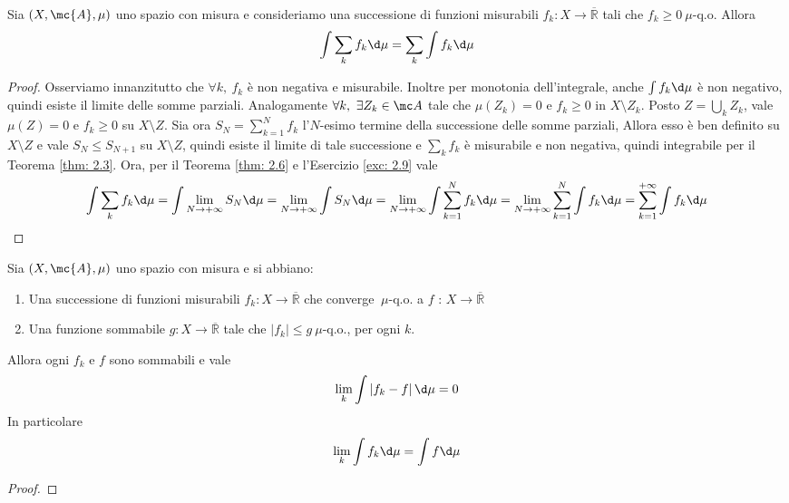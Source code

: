 \begin{corollary}\label{cor: 2.2 serie}
Sia $(X, \mc{A}, \mu)$ uno spazio con misura e consideriamo una successione di funzioni misurabili $f_{k}: X \rightarrow \overline{\mathbb{R}}$ tali che $f_{k} \geq 0 \ \mu$-q.o. Allora
\[\int \sum_{k} f_{k} \d \mu=\sum_{k} \int f_{k} \d \mu\]
\end{corollary}
\begin{proof}
    Osserviamo innanzitutto che $\forall k,\ f_k$ è non negativa e misurabile. Inoltre per monotonia dell'integrale, anche $\int f_k\d\mu$ è non negativo, quindi esiste il limite delle somme parziali. Analogamente $\forall k,\ \exists Z_k\in \mc A$ tale che $\mu(Z_k)=0$ e $f_k\geq 0$ in $X\setminus Z_k$. Posto $Z=\bigcup_kZ_k$, vale $\mu(Z)=0$ e $f_k\geq 0$ su $X\setminus Z$. Sia ora $S_N = \sum_{k=1}^Nf_k$ l'$N$-esimo termine della successione delle somme parziali, Allora esso è ben definito su $X\setminus Z$ e vale $S_N\leq S_{N+1}$ su $X\setminus Z$, quindi esiste il limite di tale successione e $\sum_kf_k$ è misurabile e non negativa, quindi integrabile per il Teorema \ref{thm: 2.3}. Ora, per il Teorema \ref{thm: 2.6} e l'Esercizio \ref{exc: 2.9} vale
    \[\int \sum_{k} f_{k} \d \mu=\int \lim_{N\to +\infty}S_N \d \mu=\lim_{N\to +\infty}\int S_N \d \mu=\lim_{N\to +\infty}\int \sum_{k=1}^Nf_k \d \mu=\lim_{N\to +\infty}\sum_{k=1}^N\int f_k \d \mu=\sum_{k=1}^{+\infty}\int f_k \d \mu\qedhere\]
\end{proof}
\begin{shadedTheorem}\label{thm: 2.7 conv dom}
Sia $(X, \mc{A}, \mu)$ uno spazio con misura e si abbiano:
\begin{enumerate}[label=$\roman*)$]
\item Una successione di funzioni misurabili $f_{k}: X \rightarrow \overline{\mathbb{R}}$ che converge $\ \mu$-q.o. a $f$ : $X \rightarrow \overline{\mathbb{R}}$
\item Una funzione sommabile $g: X \rightarrow \overline{\mathbb{R}}$ tale che $\left|f_{k}\right| \leq g \ \mu$-q.o., per ogni $k$. 
\end{enumerate}
Allora ogni $f_{k}$ e $f$ sono sommabili e vale
\[\lim _{k} \int\left|f_{k}-f\right| \d \mu=0\]
In particolare
\[\lim _{k} \int f_{k} \d \mu=\int f \d \mu\]
\end{shadedTheorem}
\begin{proof}
    \TODO
\end{proof}

